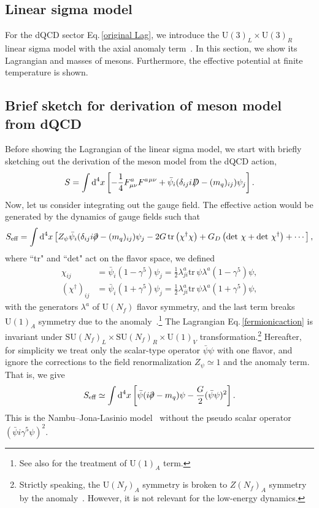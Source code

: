 \documentclass[a4paper,preprint,superscriptaddress,preprintnumbers,nofootinbib]{revtex4}
\newcommand{\Slash}[1]{{\ooalign{\hfil/\hfil\crcr$#1$}}}
\newcommand{\SU}{\text{SU}}
\newcommand{\U}{\text{U}}
\newcommand{\al}[1]{\begin{align}#1\end{align}}
\newcommand{\nn}{\nonumber\\}
\newcommand{\p}{\partial}
\newcommand{\df}{\text{d}}
\newcommand{\fn}[1]{\!\left(#1\right)}
\newcommand{\tr}{\text{tr}}
\begin{document}
\begin{appendix}
\section{{Linear} sigma model}\label{explicit linier sigma model}
For the dQCD sector Eq.\,\eqref{original Lag}, we introduce the $\U\fn{3}_L\times \U\fn{3}_R$ linear sigma model with the axial anomaly term~\cite{Schechter:1971qa,Carruthers:1972ym,Pagels:1974se,Ishida:1999qk,Lenaghan:2000ey,Roder:2003uz}.
In this section, we show its Lagrangian and masses of mesons.
Furthermore, the effective potential at finite temperature is shown.
\subsection{Brief sketch for derivation of meson model from dQCD}
Before showing the Lagrangian of the linear sigma model, we start with briefly sketching out the derivation of the meson model from the dQCD action,
\al{
S=\int \df^4x \left[ -\frac{1}{4}F_{\mu\nu}^aF^a{}^{\mu\nu} + \bar \psi_i (\delta _{ij}i\Slash D - (m_q)_{ij}) \psi_j\right].
}
Now, let us consider integrating out the gauge field.
The effective action would be generated by the dynamics of gauge fields such that
\al{
S_\text{eff}=\int \df^4x   
\left[ Z_\psi \bar \psi_i (\delta _{ij}i\Slash \p - (m_q)_{ij}) \psi_j - 2G\, \tr\left(\chi^\dagger \chi \right)+G_D\left(\det\, \chi + \det\, \chi^\dagger \right) +\cdots \right],
\label{fermionicaction}
}
where ``tr"  and ``det" act on the flavor space, we defined
\al{
\chi_{ij}&=\bar \psi_i (1-\gamma^5)\psi_j =\frac{1}{2}\lambda^a_{ji}\tr\, \psi \lambda^a(1-\gamma^5)\psi,\nn
(\chi^\dagger)_{ij}&=\bar \psi_i (1+\gamma^5)\psi_j =\frac{1}{2}\lambda^a_{ji}\tr\, \psi \lambda^a(1+\gamma^5)\psi,
}
with the generators $\lambda^a$ of $\text{U}\fn{N_f}$ flavor symmetry, and the last term breaks $\U\fn{1}_A$ symmetry due to the anomaly~\cite{Kobayashi:1970ji,tHooft:1976snw,tHooft:1986ooh}.\footnote{
See also \cite{Pawlowski:1996ch} for the treatment of $\text{U}\fn{1}_A$ term.
}
The Lagrangian Eq.\,\eqref{fermionicaction} is invariant under $\SU\fn{N_f}_L\times \SU\fn{N_f}_R\times \U\fn{1}_V$ transformation.\footnote{
Strictly speaking, the $\U\fn{N_f}_A$ symmetry is broken to $Z\fn{N_f}_A$ symmetry by the anomaly~\cite{Pisarski:1983ms}.
However, it is not relevant for the low-energy dynamics.
}
Hereafter, for simplicity we treat only the scalar-type operator $\bar \psi \psi$ with one flavor, and ignore the corrections to the field renormalization $Z_\psi\simeq 1$ and the anomaly term.
That is, we give
\al{
S_\text{eff}\simeq \int \df^4x   
\left[ \bar \psi (i\Slash \p - m_q) \psi - \frac{G}{2}(\bar \psi\psi)^2 \right].
\label{NJLtype}
}
This is the Nambu--Jona-Lasinio model~\cite{Nambu:1961tp} without the pseudo scalar operator $(\bar \psi i\gamma^5 \psi)^2$.


\end{appendix}
\end{document}
